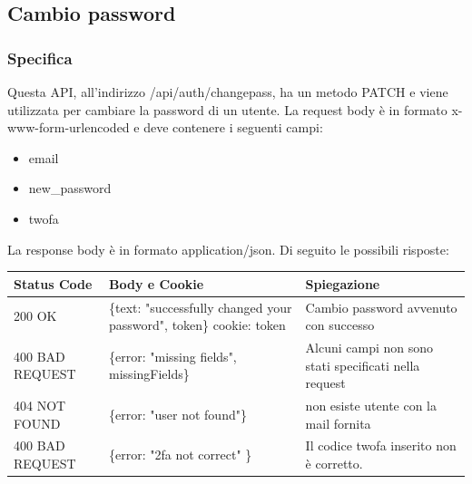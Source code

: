 \documentclass{report}
\begin{document}
\subsection{Cambio password}
\subsubsection*{Specifica}
Questa API, all'indirizzo /api/auth/changepass, ha un metodo PATCH e viene utilizzata per cambiare la password di un utente.
La request body è in formato x-www-form-urlencoded e deve contenere i seguenti campi:
\begin{itemize}
	\item email
	\item new\_password
	\item twofa
\end{itemize}
La response body è in formato application/json. Di seguito le possibili risposte:
\begin{center} %
	\centering
	\begin{tabular}{ |p{4cm}|p{5cm}|p{4cm}| }
		\hline
		\centering Status Code & \qquad\quad Body e Cookie                                           & \qquad\qquad Spiegazione                              \\ %
		\hline
		200 OK                 & \{text: "successfully changed your password", token\} cookie: token & Cambio password avvenuto con successo                 \\
		\hline
		400 BAD REQUEST        & \{error: "missing fields", missingFields\}                          & Alcuni campi non sono stati specificati nella request \\ %
		\hline
		404 NOT FOUND          & \{error: "user not found"\}                                         & non esiste utente con la mail fornita                 \\%
		\hline
		400 BAD REQUEST        & \{error: "2fa not correct" \}                                       & Il codice twofa inserito non è corretto.              \\
		\hline
	\end{tabular}
\end{center}
\end{document}
